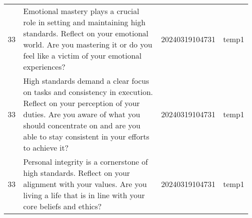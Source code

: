\begin{longtable}{rlll}
 33 &                                                                                                                                                                                                                                                                                                                                                                                                                                                                                                                                                                                                                                                                                                                                                                 Emotional mastery plays a crucial role in setting and maintaining high standards. Reflect on your emotional world. Are you mastering it or do you feel like a victim of your emotional experiences? & 20240319104731 &       temp1 \\
 33 &                                                                                                                                                                                                                                                                                                                                                                                                                                                                                                                                                                                                                                                                                                                            High standards demand a clear focus on tasks and consistency in execution. Reflect on your perception of your duties. Are you aware of what you should concentrate on and are you able to stay consistent in your efforts to achieve it? & 20240319104731 &       temp1 \\
 33 &                                                                                                                                                                                                                                                                                                                                                                                                                                                                                                                                                                                                                                                                                                                                                                                         Personal integrity is a cornerstone of high standards. Reflect on your alignment with your values. Are you living a life that is in line with your core beliefs and ethics? & 20240319104731 &       temp1 \\

\end{longtable}
